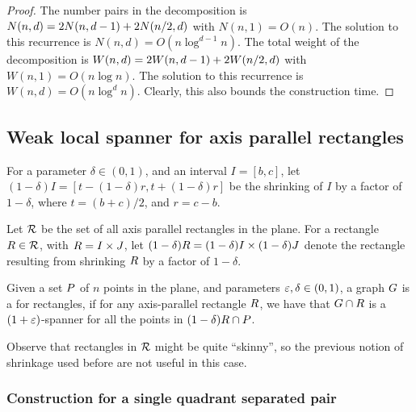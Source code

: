 \documentclass[12pt]{article}%
\begin{document}
\begin{proof}
    The number pairs in the decomposition is
    \begin{math}
        N(n,d) = 2N(n,d-1) + 2N\pth{ n/2, d }
    \end{math}
    with $N(n,1) = O(n)$. The solution to this recurrence is
    $N(n,d) = O( n \log^{d-1} n)$.  The total weight of the
    decomposition is
    \begin{math}
        W(n,d) = 2W(n,d-1) + 2W\pth{ n/2, d }
    \end{math}
    with $W(n,1) = O(n \log n)$. The solution to this recurrence is
    $W(n,d) = O( n \log^{d} n)$. Clearly, this also bounds the
    construction time.
\end{proof}


\subsection{Weak local spanner for axis parallel rectangles}

For a parameter $\delta \in (0,1)$, and an interval $I = [b,c]$, let
$(1-\delta)I = [t - (1-\delta)r, t+ (1-\delta)r]$ be the shrinking of
$I$ by a factor of $1-\delta$, where $t = (b+c)/2$, and $r = c-b$.


Let $\mathcal{R}$ be the set of all axis parallel rectangles in the
plane. For a rectangle $R \in \mathcal{R}$, with $R = I \times J$,
let $(1-\delta)R = (1-\delta)I \times (1-\delta)J$ denote the
rectangle resulting from shrinking $R$ by a factor of $1-\delta$.

\begin{defn}
    Given a set $P$ of $n$ points in the plane, and parameters
    $\varepsilon, \delta \in (0,1)$, a graph $G$ is a
     for rectangles, if
    for any axis-parallel rectangle $R$, we have that
    $G \cap {R}$ is a $(1+\varepsilon)$-spanner for all the points
    in $(1-\delta)R \cap P$.
\end{defn}

Observe that rectangles in $\mathcal{R}$ might be quite ``skinny'', so the
previous notion of shrinkage used before are not useful in this case.

\subsubsection{Construction for a single quadrant separated pair}
\end{document}
